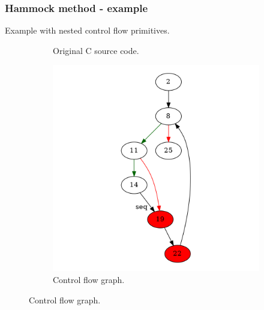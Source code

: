 \documentclass[aspectratio=1610]{beamer}
\begin{document}
\begin{frame}[noframenumbering]
	\frametitle{Hammock method - example}
	Example with nested control flow primitives.
	\begin{figure}[htbp]
		\centering
		\begin{subfigure}[b]{0.30\textwidth}
			\centering
			
			\caption{Original C source code.}
		\end{subfigure}
		\begin{subfigure}[b]{0.50\textwidth}
			\centering
			\includegraphics[height=0.6\paperheight]{inc/methods/hammock/example/without-break/main_0001a.png}
			\caption{Control flow graph.}
		\end{subfigure}
	\end{figure}
\end{frame}
\end{document}
